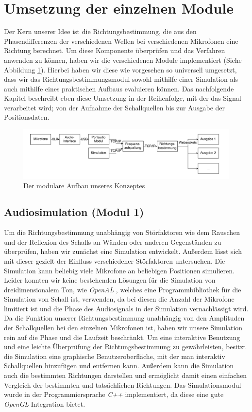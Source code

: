 \section{Umsetzung der einzelnen Module}
Der Kern unserer Idee ist die Richtungsbestimmung, die aus den Phasendifferenzen der verschiedenen Wellen bei verschiedenen Mikrofonen eine Richtung berechnet. Um diese Komponente überprüfen und das Verfahren anwenden zu können, haben wir die verschiedenen Module implementiert (Siehe Abbildung \ref{fig:flowchart}). Hierbei haben wir diese wie vorgesehen so universell umgesetzt, dass wir das Richtungsbestimmungsmodul sowohl mithilfe einer Simulation als auch mithilfe eines praktischen Aufbaus evaluieren können. Das nachfolgende Kapitel beschreibt eben diese Umsetzung in der Reihenfolge, mit der das Signal verarbeitet wird; von der Aufnahme der Schallquellen bis zur Ausgabe der Positionsdaten.
\begin{figure}[H]
	\includegraphics[width=\linewidth]{img/flowchart}
	\caption{Der modulare Aufbau unseres Konzeptes}
	\label{fig:flowchart}
\end{figure}

\subsection{Audiosimulation (Modul 1)}
Um die Richtungsbestimmung unabhängig von Störfaktoren wie dem Rauschen und der Reflexion des Schalls an Wänden oder anderen Gegenständen zu überprüfen, haben wir zunächst eine Simulation entwickelt. Außerdem lässt sich mit dieser gezielt der Einfluss verschiedener Störfaktoren untersuchen. Die Simulation kann beliebig viele Mikrofone an beliebigen Positionen simulieren. Leider konnten wir keine bestehenden Lösungen für die Simulation von dreidimensionalem Ton, wie \textit{OpenAL} \cite{OpenAL}, welches eine Programmbibliothek für die Simulation von Schall ist, verwenden, da bei diesen die Anzahl der Mikrofone limitiert ist und die Phase des Audiosignals in der Simulation vernachlässigt wird. Da die Funktion unserer Richtungsbestimmung unabhängig von den Amplituden der Schallquellen bei den einzelnen Mikrofonen ist, haben wir unsere Simulation rein auf die Phase und die Laufzeit beschränkt. Um eine interaktive Benutzung und eine leichte Überprüfung der Richtungsbestimmung zu gewährleisten, besitzt die Simulation eine graphische Benutzeroberfläche, mit der man interaktiv Schallquellen hinzufügen und entfernen kann. Außerdem kann die Simulation auch die bestimmten Richtungen darstellen und ermöglicht damit einen einfachen Vergleich der bestimmten und tatsächlichen Richtungen. Das Simulationsmodul wurde in der Programmiersprache \textit{C++} implementiert, da diese eine gute \textit{OpenGL} Integration bietet.

